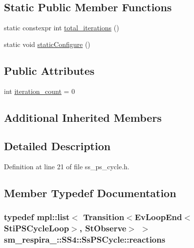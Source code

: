 \subsection*{Static Public Member Functions}
\begin{DoxyCompactItemize}
\item 
static constexpr int \hyperlink{structsm__respira__1_1_1SS4_1_1SsPSCycle_a812d9e6bd288fe71ad44d30b4e63bc87}{total\+\_\+iterations} ()
\item 
static void \hyperlink{structsm__respira__1_1_1SS4_1_1SsPSCycle_a1d9cf15cc9fc3453cc3bafed4b18d313}{static\+Configure} ()
\end{DoxyCompactItemize}
\subsection*{Public Attributes}
\begin{DoxyCompactItemize}
\item 
int \hyperlink{structsm__respira__1_1_1SS4_1_1SsPSCycle_aeb5bdbd23c6c8b5614d7f3cca52216bd}{iteration\+\_\+count} = 0
\end{DoxyCompactItemize}
\subsection*{Additional Inherited Members}


\subsection{Detailed Description}


Definition at line 21 of file ss\+\_\+ps\+\_\+cycle.\+h.



\subsection{Member Typedef Documentation}
\subsubsection[{\texorpdfstring{reactions}{reactions}}]{\setlength{\rightskip}{0pt plus 5cm}typedef mpl\+::list$<$ Transition$<$Ev\+Loop\+End$<${\bf Sti\+P\+S\+Cycle\+Loop}$>$, {\bf St\+Observe}$>$ $>$ {\bf sm\+\_\+respira\+\_\+::\+S\+S4\+::\+Ss\+P\+S\+Cycle\+::reactions}}\hypertarget{structsm__respira__1_1_1SS4_1_1SsPSCycle_aad6397ffff7eef88efc3824b91423462}{}\label{structsm__respira__1_1_1SS4_1_1SsPSCycle_aad6397ffff7eef88efc3824b91423462}


